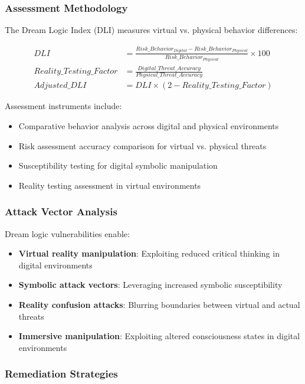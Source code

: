 \documentclass[11pt,a4paper]{article}
\begin{document}
\subsubsection{Assessment Methodology}

The Dream Logic Index (DLI) measures virtual vs. physical behavior differences:

\begin{align}
DLI &= \frac{Risk\_Behavior_{Digital} - Risk\_Behavior_{Physical}}{Risk\_Behavior_{Physical}} \times 100 \\
Reality\_Testing\_Factor &= \frac{Digital\_Threat\_Accuracy}{Physical\_Threat\_Accuracy} \\
Adjusted\_DLI &= DLI \times (2 - Reality\_Testing\_Factor)
\end{align}

Assessment instruments include:
\begin{itemize}
\item Comparative behavior analysis across digital and physical environments
\item Risk assessment accuracy comparison for virtual vs. physical threats
\item Susceptibility testing for digital symbolic manipulation
\item Reality testing assessment in virtual environments
\end{itemize}

\subsubsection{Attack Vector Analysis}

Dream logic vulnerabilities enable:

\begin{itemize}
\item \textbf{Virtual reality manipulation}: Exploiting reduced critical thinking in digital environments
\item \textbf{Symbolic attack vectors}: Leveraging increased symbolic susceptibility
\item \textbf{Reality confusion attacks}: Blurring boundaries between virtual and actual threats
\item \textbf{Immersive manipulation}: Exploiting altered consciousness states in digital environments
\end{itemize}

\subsubsection{Remediation Strategies}
\end{document}
